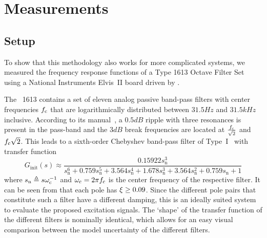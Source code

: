 \section{Measurements} 
\label{sec:excitation:measurement}
  \subsection{Setup}
    \label{sec:excitation:measurement:setup}
    To show that this methodology also works for more complicated systems, we measured the frequency response functions of a \bruelkjaer{} Type 1613 Octave Filter Set using a National Instruments Elvis~II board driven by \labview.
    
    The \BK~1613 contains a set of eleven analog passive band-pass filters with center frequencies $f_{\mathrm{c}}$ that are logarithmically distributed between $31.5\unit{Hz}$ and $31.5\unit{kHz}$ inclusive.
    According to its manual~\citep{datasheet_bk1613}, a $0.5\unit{dB}$ ripple with three resonances is present in the pass-band and the $3\unit{dB}$ break frequencies are located at $\frac{f_{\mathrm{c}}}{\sqrt{2}}$ and $f_{\mathrm{c}} \sqrt{2}$.
    This leads to a sixth-order Chebyshev band-pass filter of Type~I~\citep{Zverev1967} with transfer function
    \begin{equation}
       G_{\mathrm{init}}(s) \approx 
      \frac{0.15922 s_{\mathrm{n}}^3 }
                {              s_{\mathrm{n}}^6 
                + 0.759 s_{\mathrm{n}}^5 
                + 3.564 s_{\mathrm{n}}^4 
                + 1.678 s_{\mathrm{n}}^3 
                + 3.564 s_{\mathrm{n}}^2 
                + 0.759 s_{\mathrm{n}} 
                + 1}
      \label{eq:excitation:bk1613:tf-init}
     \end{equation}
     where $s_{\mathrm{n}} \triangleq s \omega_{\mathrm{c}}^{-1}$ and $\omega_{\mathrm{c}}=2\pi f_{\mathrm{c}}$ is the center frequency of the respective filter.
     It can be seen from  that each pole has $\xi_{} \geq 0.09$.
    Since the different pole pairs that constitute such a filter have a different damping, this is an ideally suited system to evaluate the proposed excitation signals.
    The `shape' of the transfer function of the different filters is nominally identical, which allows for an easy visual comparison between the model uncertainty of the different filters.

